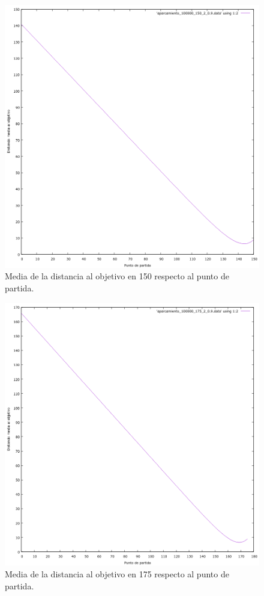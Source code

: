 \documentclass[12pt, spanish]{article}
\begin{document}
\begin{figure}[H]
	\centering
	\includegraphics[scale = 0.6]{aparcamiento_100000_150_2_0-9.png}
	\caption{Media de la distancia al objetivo en 150 respecto al punto de partida.}
	\label{fig:ej4}
\end{figure}

\begin{figure}[H]
	\centering
	\includegraphics[scale = 0.6]{aparcamiento_100000_175_2_0-9.png}
	\caption{Media de la distancia al objetivo en 175 respecto al punto de partida.}
	\label{fig:ej4}
\end{figure}
\end{document}
